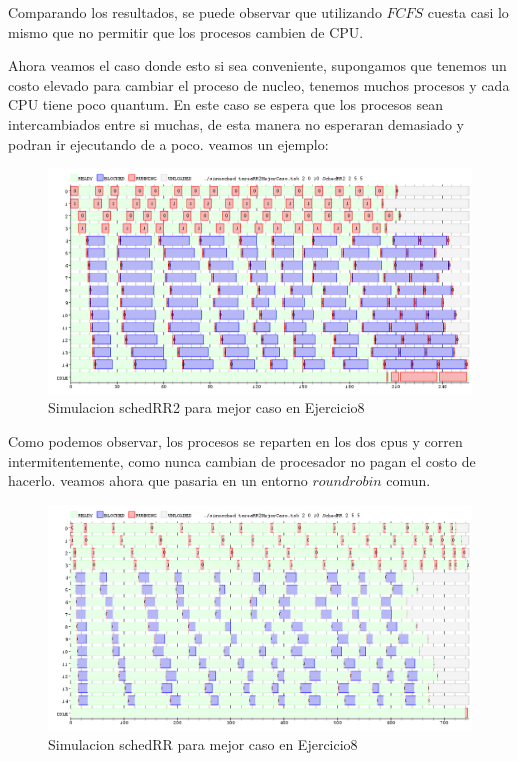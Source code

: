 \documentclass[11pt]{article}
\begin{document}
  Comparando los resultados, se puede observar que utilizando $FCFS$ cuesta casi lo mismo que no permitir que los procesos cambien de CPU.


  Ahora veamos el caso donde esto si sea conveniente, supongamos que tenemos un costo elevado para cambiar el proceso de nucleo, tenemos muchos procesos y cada CPU tiene poco quantum. En este caso se espera que los procesos sean intercambiados entre si muchas, de esta manera no esperaran demasiado y podran ir ejecutando de a poco. veamos un ejemplo:


    \begin{figure}[H]
      \includegraphics[scale=0.5]{Ej8MejorCasoRR2}
      \caption{Simulacion schedRR2 para mejor caso en Ejercicio8}
    \end{figure}

  Como podemos observar, los procesos se reparten en los dos cpus y corren intermitentemente, como nunca cambian de procesador no pagan el costo de hacerlo. veamos ahora que pasaria en un entorno $round robin$ comun.

    \begin{figure}[H]
      \includegraphics[scale=0.5]{Ej8MejorCasoRR}
      \caption{Simulacion schedRR para mejor caso en Ejercicio8}
    \end{figure}
\end{document}
